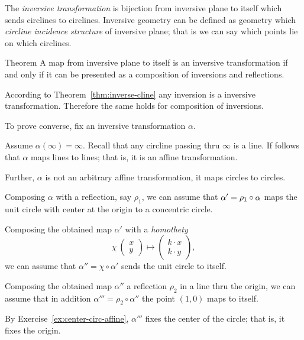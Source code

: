 The \emph{inversive transformation} is bijection from inversive plane to itself which sends circlines to circlines.
Inversive geometry can be defined as geometry which  {}\emph{circline incidence structure} of inversive plane;
that is we can say which points lie on which circlines.

\begin{thm}{Theorem}\label{thm:inversions-inversive}
A map from inversive plane to itself is an inversive transformation
if and only if it can be presented as a composition of inversions and reflections.  
\end{thm}

According to Theorem~\ref{thm:inverse-cline} any inversion is a inversive transformation.
Therefore the same holds for composition of inversions.

To prove converse, 
fix an inversive transformation $\alpha$.

Assume $\alpha(\infty)=\infty$.
Recall that any circline passing thru $\infty$ is a line.
If follows that $\alpha$ maps lines to lines;
that is,
it is an affine transformation.

Further, $\alpha$ is not an arbitrary affine transformation,
it maps circles to circles.

Composing $\alpha$ with a reflection, say $\rho_1$, we can assume that $\alpha'\z=\rho_1\circ\alpha$ maps the unit circle with center at the origin to a concentric circle. 

Composing the obtained map $\alpha'$ with a {}\emph{homothety} 
\[\chi\:\left(\begin{smallmatrix}
x\\ y
\end{smallmatrix} \right)\mapsto \left(\begin{smallmatrix}
k\cdot x\\ k\cdot y
\end{smallmatrix} \right),\]
we can assume that $\alpha''=\chi\circ\alpha'$ sends the unit circle to itself.


Composing the obtained map $\alpha''$
 a reflection $\rho_2$ in a line thru the origin,
we can assume that in addition $\alpha'''=\rho_2\circ\alpha''$ the point $(1,0)$ maps to itself.

By Exercise~\ref{ex:center-circ-affine},
$\alpha'''$ fixes the center of the circle;
that is, it fixes the origin.

